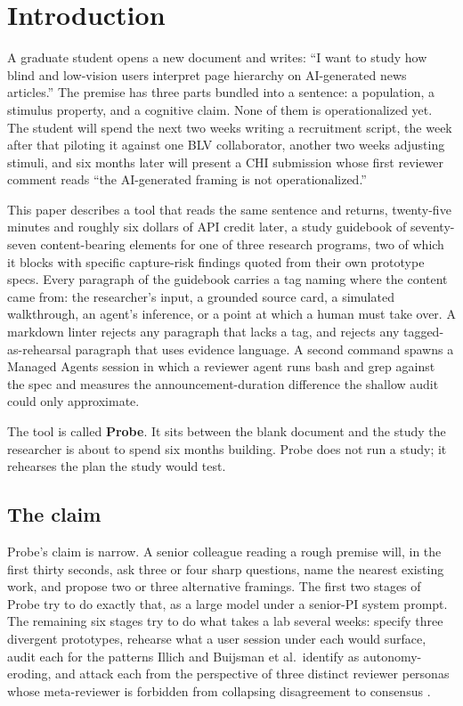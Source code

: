 \section{Introduction}

A graduate student opens a new document and writes: ``I want to study how blind and low-vision users interpret page hierarchy on AI-generated news articles.'' The premise has three parts bundled into a sentence: a population, a stimulus property, and a cognitive claim. None of them is operationalized yet. The student will spend the next two weeks writing a recruitment script, the week after that piloting it against one BLV collaborator, another two weeks adjusting stimuli, and six months later will present a CHI submission whose first reviewer comment reads ``the AI-generated framing is not operationalized.''

This paper describes a tool that reads the same sentence and returns, twenty-five minutes and roughly six dollars of API credit later, a study guidebook of seventy-seven content-bearing elements for one of three research programs, two of which it blocks with specific capture-risk findings quoted from their own prototype specs. Every paragraph of the guidebook carries a tag naming where the content came from: the researcher's input, a grounded source card, a simulated walkthrough, an agent's inference, or a point at which a human must take over. A markdown linter rejects any paragraph that lacks a tag, and rejects any tagged-as-rehearsal paragraph that uses evidence language. A second command spawns a Managed Agents session in which a reviewer agent runs bash and grep against the spec and measures the announcement-duration difference the shallow audit could only approximate.

The tool is called \textbf{Probe}. It sits between the blank document and the study the researcher is about to spend six months building. Probe does not run a study; it rehearses the plan the study would test.

\subsection{The claim}

Probe's claim is narrow. A senior colleague reading a rough premise will, in the first thirty seconds, ask three or four sharp questions, name the nearest existing work, and propose two or three alternative framings. The first two stages of Probe try to do exactly that, as a large model under a senior-PI system prompt. The remaining six stages try to do what takes a lab several weeks: specify three divergent prototypes, rehearse what a user session under each would surface, audit each for the patterns Illich and Buijsman et al.\ identify as autonomy-eroding, and attack each from the perspective of three distinct reviewer personas whose meta-reviewer is forbidden from collapsing disagreement to consensus \citep{illich1973conviviality, buijsman2025autonomy}.

